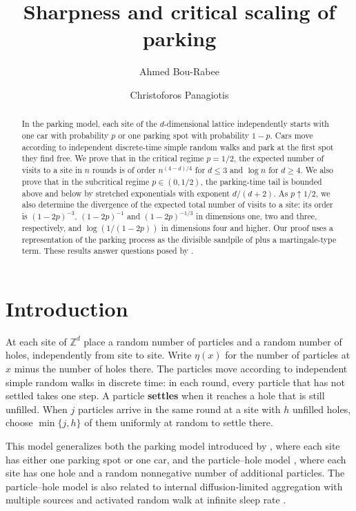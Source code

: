 \documentclass[11pt]{amsart}
\theoremstyle{plain}
\theoremstyle{definition}
\newcommand{\Z}{\mathbb{Z}}
\begin{document}
\title{Sharpness and critical scaling of parking}

\author{Ahmed Bou-Rabee}
\author{Christoforos Panagiotis}

\begin{abstract}
In the parking model, each site of the $d$-dimensional lattice independently
starts with one car with probability $p$ or one parking spot with probability $1-p$. Cars move according to independent discrete-time simple random walks and park at the first spot they find free. We prove that in the critical regime $p=1/2$, the expected number of visits to a site in $n$ rounds is of order
$n^{(4-d)/4}$ for $d\leq3$ and $\log n$ for $d\geq4$. We also prove that in the subcritical regime $p\in(0,1/2)$, the parking-time tail is bounded above and below by stretched exponentials with exponent $d/(d+2)$. As $p\uparrow1/2$, we also determine the divergence of the
expected total number of visits to a site: its order is $(1-2p)^{-3}$,
$(1-2p)^{-1}$ and $(1-2p)^{-1/3}$ in dimensions one, two and three,
respectively, and $\log(1/(1-2p))$ in dimensions four and higher. Our proof uses a representation of the parking process as the divisible sandpile of \citet{LevinePeres09} plus a martingale-type term.
These results answer questions posed by \citet{DGJLS}.
\end{abstract}

\maketitle

{\small\tableofcontents}

\section{Introduction}\label{sec:intro}
At each site of $\Z^d$ place a random number of particles and a random number of
holes, independently from site to site. Write $\eta(x)$ for the number of particles at $x$ minus the number of holes there. The particles move according to independent simple random walks in discrete time: in each round, every particle that has not settled takes one step. A particle \textbf{settles} when it reaches a hole that is still unfilled. When $j$ particles arrive in the same round at a site with $h$ unfilled holes, choose $\min\{j,h\}$ of them uniformly at random to settle there.

This model generalizes both the parking model introduced by \citet{DGJLS}, where each site has either one parking spot or one car, and the particle--hole model \citep[Section~2]{CRS14}, where each site has one hole and a random nonnegative number of additional particles. The particle--hole model is also related to internal diffusion-limited aggregation with multiple sources and activated
random walk at infinite sleep rate \citep[Sections~1.1 and~10.3]{Rolla}.
\end{document}
